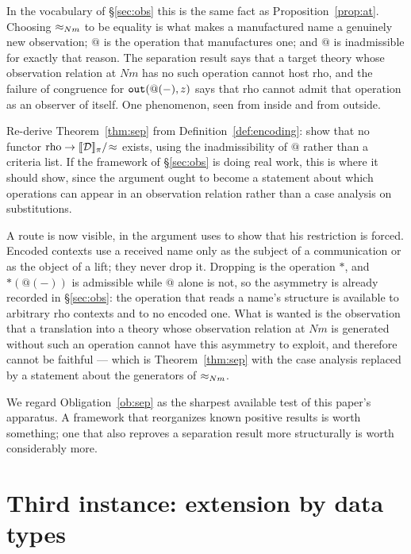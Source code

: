 \documentclass{article}
\begin{document}
In the vocabulary of \S\ref{sec:obs} this is the same fact as Proposition~\ref{prop:at}. Choosing $\approx_{Nm}$ to be equality is what makes a manufactured name a genuinely new observation; $@$ is the operation that manufactures one; and $@$ is inadmissible for exactly that reason. The separation result says that a target theory whose observation relation at $Nm$ has no such operation cannot host rho, and the failure of congruence for $\mathtt{out}(@(-),z)$ says that rho cannot admit that operation as an observer of itself. One phenomenon, seen from inside and from outside.

\begin{obligation}
\label{ob:sep}
    Re-derive Theorem~\ref{thm:sep} from Definition~\ref{def:encoding}: show that no functor $\mathrm{rho}\to[\![\mathcal{D}]\!]_\pi/\!\approx$ exists, using the inadmissibility of $@$ rather than a criteria list. If the framework of \S\ref{sec:obs} is doing real work, this is where it should show, since the argument ought to become a statement about which operations can appear in an observation relation rather than a case analysis on substitutions.

    A route is now visible, in the argument \citet{nowns} uses to show that his restriction is forced. Encoded contexts use a received name only as the subject of a communication or as the object of a lift; they never drop it. Dropping is the operation $\ast$, and $\ast(@(-))$ is admissible while $@$ alone is not, so the asymmetry is already recorded in \S\ref{sec:obs}: the operation that reads a name's structure is available to arbitrary rho contexts and to no encoded one. What is wanted is the observation that a translation into a theory whose observation relation at $Nm$ is generated without such an operation cannot have this asymmetry to exploit, and therefore cannot be faithful --- which is Theorem~\ref{thm:sep} with the case analysis replaced by a statement about the generators of $\approx_{Nm}$.
\end{obligation}

We regard Obligation~\ref{ob:sep} as the sharpest available test of this paper's apparatus. A framework that reorganizes known positive results is worth something; one that also reproves a separation result more structurally is worth considerably more.


\section{Third instance: extension by data types}
\label{sec:data}
\end{document}
